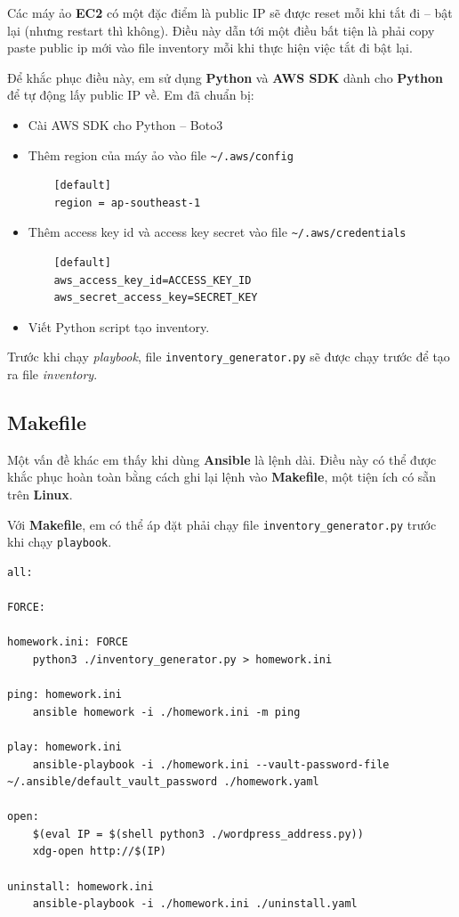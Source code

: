 \documentclass{article}
\begin{document}
\par Các máy ảo \textbf{EC2} có một đặc điểm là public IP sẽ được reset mỗi khi tắt đi -- bật lại (nhưng restart thì không). Điều này dẫn tới một điều bất tiện là phải copy paste public ip mới vào file inventory mỗi khi thực hiện việc tắt đi bật lại.

\par Để khắc phục điều này, em sử dụng \textbf{Python} và \textbf{AWS SDK} dành cho \textbf{Python} để tự động lấy public IP về. Em đã chuẩn bị:

\begin{itemize}
    \item Cài AWS SDK cho Python -- Boto3
    \item Thêm region của máy ảo vào file \texttt{\textasciitilde/.aws/config}
    \begin{verbatim}
    [default]
    region = ap-southeast-1
    \end{verbatim}
    \item Thêm access key id và access key secret vào file \texttt{\textasciitilde/.aws/credentials}
    \begin{verbatim}
    [default]
    aws_access_key_id=ACCESS_KEY_ID
    aws_secret_access_key=SECRET_KEY
    \end{verbatim}
    \item Viết Python script tạo inventory.
\end{itemize}

\par Trước khi chạy \textit{playbook}, file \texttt{inventory\_generator.py} sẽ được chạy trước để tạo ra file \textit{inventory}.

\subsection{Makefile}

\par Một vấn đề khác em thấy khi dùng \textbf{Ansible} là lệnh dài. Điều này có thể được khắc phục hoàn toàn bằng cách ghi lại lệnh vào \textbf{Makefile}, một tiện ích có sẵn trên \textbf{Linux}.

\par Với \textbf{Makefile}, em có thể áp đặt phải chạy file \texttt{inventory\_generator.py} trước khi chạy \texttt{playbook}.

\begin{verbatim}
all:

FORCE:

homework.ini: FORCE
    python3 ./inventory_generator.py > homework.ini

ping: homework.ini
    ansible homework -i ./homework.ini -m ping

play: homework.ini
    ansible-playbook -i ./homework.ini --vault-password-file ~/.ansible/default_vault_password ./homework.yaml

open:
    $(eval IP = $(shell python3 ./wordpress_address.py))
    xdg-open http://$(IP)

uninstall: homework.ini
    ansible-playbook -i ./homework.ini ./uninstall.yaml
\end{verbatim}
\end{document}
